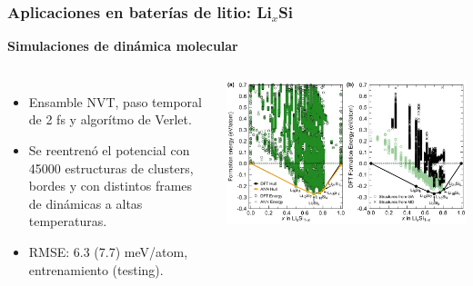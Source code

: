 \documentclass[aspectratio=169]{beamer}
\let\oldtextbf\textbf
\renewcommand{\textbf}[1]{\textcolor{nordblue}{\oldtextbf{#1}}}
\begin{document}
    \begin{frame}
        \frametitle{Aplicaciones en baterías de litio: Li$_x$Si}
        
        \textbf{Simulaciones de dinámica molecular}
        
        \begin{columns}
            \begin{itemize}
                \item Ensamble NVT, paso temporal de 2 fs y algorítmo de Verlet.
                \item Se reentrenó el potencial con 45000 estructuras de clusters, 
                    bordes y con distintos frames de dinámicas a altas
                    temperaturas.
                \item RMSE: 6.3 (7.7) meV/atom, entrenamiento (testing).
            \end{itemize}

            \pause

            \begin{center}
                \includegraphics[width=\columnwidth]{LiSi-energias_de_formacion.png}
            \end{center}
        \end{columns}
            
    \end{frame}
    
\end{document}
